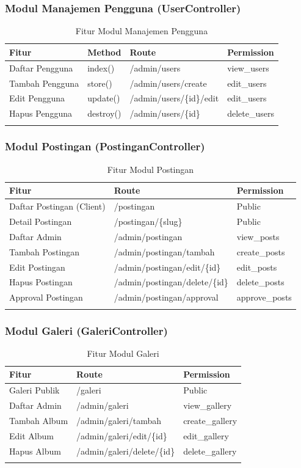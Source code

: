 \documentclass[12pt,a4paper]{article}
\begin{document}
\subsubsection{Modul Manajemen Pengguna (UserController)}
\begin{longtable}{|l|l|l|l|}
\hline
\textbf{Fitur} & \textbf{Method} & \textbf{Route} & \textbf{Permission} \\
\hline
Daftar Pengguna & index() & /admin/users & view\_users \\
Tambah Pengguna & store() & /admin/users/create & edit\_users \\
Edit Pengguna & update() & /admin/users/\{id\}/edit & edit\_users \\
Hapus Pengguna & destroy() & /admin/users/\{id\} & delete\_users \\
\hline
\caption{Fitur Modul Manajemen Pengguna}
\end{longtable}

\subsubsection{Modul Postingan (PostinganController)}
\begin{longtable}{|l|l|l|}
\hline
\textbf{Fitur} & \textbf{Route} & \textbf{Permission} \\
\hline
Daftar Postingan (Client) & /postingan & Public \\
Detail Postingan & /postingan/\{slug\} & Public \\
Daftar Admin & /admin/postingan & view\_posts \\
Tambah Postingan & /admin/postingan/tambah & create\_posts \\
Edit Postingan & /admin/postingan/edit/\{id\} & edit\_posts \\
Hapus Postingan & /admin/postingan/delete/\{id\} & delete\_posts \\
Approval Postingan & /admin/postingan/approval & approve\_posts \\
\hline
\caption{Fitur Modul Postingan}
\end{longtable}

\subsubsection{Modul Galeri (GaleriController)}
\begin{longtable}{|l|l|l|}
\hline
\textbf{Fitur} & \textbf{Route} & \textbf{Permission} \\
\hline
Galeri Publik & /galeri & Public \\
Daftar Admin & /admin/galeri & view\_gallery \\
Tambah Album & /admin/galeri/tambah & create\_gallery \\
Edit Album & /admin/galeri/edit/\{id\} & edit\_gallery \\
Hapus Album & /admin/galeri/delete/\{id\} & delete\_gallery \\
\hline
\caption{Fitur Modul Galeri}
\end{longtable}
\end{document}
